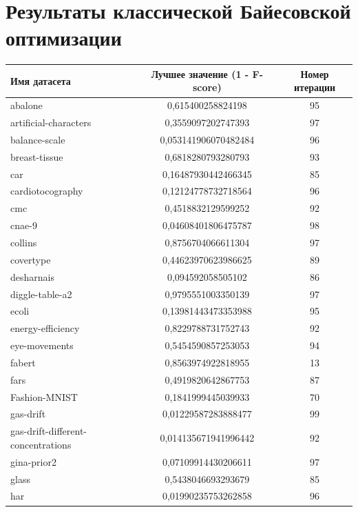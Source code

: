 \documentclass[times,specification,annotation]{itmo-student-thesis}
\begin{document}
\chapter{Результаты классической Байесовской оптимизации}\label{app:bo-results}
\begin{center}
	\begin{longtable}{ |m{5cm}|c|c| } 
		\hline
		\textbf{Имя датасета} & \textbf{Лучшее значение (1 - F-score)} & \textbf{Номер итерации} \\ 
		\hline\hline
		abalone & 0,615400258824198 & 95 \\
		\hline
		artificial-characters & 0,3559097202747393 & 97 \\
		\hline
		balance-scale & 0,053141906070482484 & 96 \\
		\hline
		breast-tissue & 0,6818280793280793 & 93 \\
		\hline
		car & 0,16487930442466345 & 85 \\
		\hline
		cardiotocography & 0,12124778732718564 & 96 \\
		\hline
		cmc & 0,4518832129599252 & 92 \\
		\hline
		cnae-9 & 0,04608401806475787 & 98 \\
		\hline
		collins & 0,8756704066611304 & 97 \\
		\hline
		covertype & 0,44623970623986625 & 89 \\
		\hline
		desharnais & 0,094592058505102 & 86 \\
		\hline
		diggle-table-a2 & 0,9795551003350139 & 97 \\
		\hline
		ecoli & 0,13981443473353988 & 95 \\
		\hline
		energy-efficiency & 0,8229788731752743 & 92 \\
		\hline
		eye-movements & 0,5454590857253053 & 94 \\
		\hline
		fabert & 0,8563974922818955 & 13 \\
		\hline
		fars & 0,4919820642867753 & 87 \\
		\hline
		Fashion-MNIST & 0,1841999445039933 & 70 \\
		\hline
		gas-drift & 0,01229587283888477 & 99 \\
		\hline
		gas-drift-different-concentrations & 0,014135671941996442 & 92 \\
		\hline
		gina-prior2 & 0,07109914430206611 & 97 \\
		\hline
		glass & 0,5438046693293679 & 85 \\
		\hline
		har & 0,01990235753262858 & 96 \\

\end{longtable}
\end{center}
\end{document}
